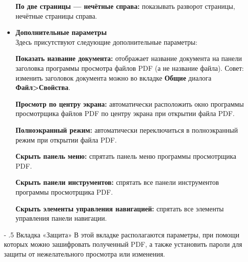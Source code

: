 ﻿\documentclass[a4paper,10pt]{article}
\makeatletter
\renewcommand\paragraph{%
   \@startsection{paragraph}{4}{0mm}%
      {-\baselineskip}%
      {.5\baselineskip}%
      {\normalfont\normalsize\bfseries}}
\makeatother
\begin{document}
\begin{itemize}
 \textbf{По две страницы — нечётные справа:} показывать разворот страницы, нечётные страницы справа.
 \item \textbf{Дополнительные параметры}\\
 Здесь присутствуют следующие дополнительные параметры:
 
 \textbf{Показать название документа:} отображает название документа на панели заголовка программы просмотра файлов PDF (а не название файла). Совет: изменить заголовок документа можно во вкладке \textbf{Общие} диалога \textbf{Файл>Свойства}.
 
 \textbf{Просмотр по центру экрана:} автоматически расположить окно программы просмотрщика файлов PDF по центру экрана при открытии файла PDF.
 
 \textbf{Полноэкранный режим:} автоматически переключиться в полноэкранный режим при открытии файла PDF.
 
 \textbf{Скрыть панель меню:} спрятать панель меню программы просмотрщика PDF.
 
 \textbf{Скрыть панели инструментов:} спрятать все панели инструментов программы просмотрщика PDF.
 
 \textbf{Скрыть элементы управления навигацией:} спрятать все элементы управления панели навигации.
\end{itemize}

\paragraph{Вкладка «Защита»}
В этой вкладке располагаются параметры, при помощи которых можно зашифровать полученный PDF, а также установить пароли для защиты от нежелательного просмотра или изменения.
\end{document}
